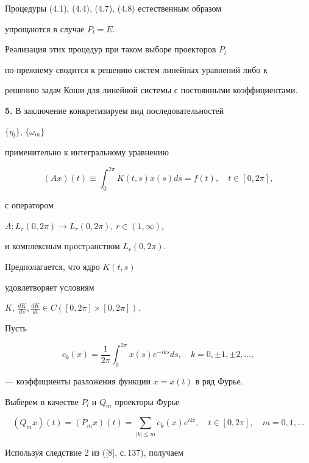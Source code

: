 Процедуры (4.1), (4.4), (4.7), (4.8) естественным образом


упрощаются в случае $P_l=E$.


Реализация этих процедур при таком выборе проекторов $P_l$


по-прежнему сводится к решению систем линейных уравнений либо к


решению задач Коши для линейной системы с постоянными коэффициентами.


\medskip





{\bf 5.} В заключение конкретизируем вид последовательностей


$\{ \eta_l \}$, $\{ \omega_m \}$


применительно к интегральному уравнению


\begin{equation}


(Ax)(t)\equiv \int^{2 \pi}_0 K(t,s) x(s) ds=f(t), \quad t \in [0, 2 \pi],


\tag{5.1}


\end{equation}


с оператором


$A:L_r (0, 2 \pi) \to L_r (0, 2 \pi)$, $r \in (1, \infty)$,


и комплексным пpостpанством $L_r (0, 2 \pi)$.


Предполагается, что ядро $K(t,s)$


удовлетворяет условиям


$K$, $\frac{dK}{ds},\frac{dK}{dt} \in C([0, 2 \pi] \times [0, 2 \pi])$.


Пусть


$$


c_k(x)=\frac{1}{2 \pi} \int^{2 \pi}_0 x(s) e^{-iks} ds,


\quad k=0, \pm 1, \pm 2, \dotsc,


$$


--- коэффициенты разложения функции $x=x(t)$ в ряд Фурье.


Выберем в качестве $P_l$ и $Q_m$ проекторы Фурье


$$


(Q_m x)(t)=(P_m x)(t)= \sum_{| k | \leq m}c_k(x) e^{ikt},


\quad t \in [0, 2 \pi], \quad m=0, 1, \dotsc


$$


Используя следствие 2 из ([8], с.\,137), получаем


